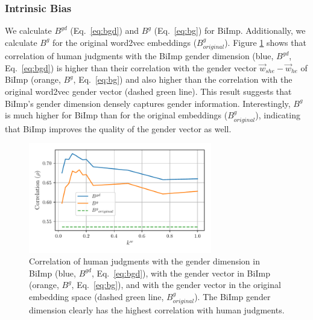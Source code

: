 \documentclass[11pt,a4paper]{article}
\def\proposedmethod{BiImp}
\begin{document}
\subsubsection{Intrinsic Bias}\label{sec:intrinsic_bias}
We calculate $B^{gd}$ (Eq.\  \ref{eq:bgd}) and $B^{g}$
(Eq.\  \ref{eq:bg}) for \proposedmethod{}. Additionally, we calculate $B^{g}$ for the original
word2vec embeddings ($B^{g}_{original}$).  Figure
\ref{fig:corr} shows that correlation of human judgments
with the \proposedmethod{} gender dimension (blue, $B^{gd}$,
Eq.\  \ref{eq:bgd}) is higher than their correlation with
the gender
vector $\vec{w}_{she} - \vec{w}_{he}$ of \proposedmethod{}
(orange, $B^{g}$, Eq.\  \ref{eq:bg}) and also
higher than the correlation with the 
original
word2vec gender vector (dashed green line). This result suggests
that \proposedmethod{}'s gender dimension  densely captures  gender
information. Interestingly, $B^{g}$ is
much higher for \proposedmethod{} than for the
original embeddings ($B^{g}_{original}$), indicating that
\proposedmethod{} improves the quality of the gender vector
as well.



\begin{figure}[h]
 	\centering
	\includegraphics[width=8.0cm]{Figures/gender_correlation.pdf}
	\caption{Correlation of human judgments with the
          gender dimension in \proposedmethod{} (blue,
          $B^{gd}$, Eq.\  \ref{eq:bgd}), with the gender
          vector in \proposedmethod{} (orange, $B^{g}$,
          Eq.\  \ref{eq:bg}), and with the gender vector in
          the original embedding space (dashed green line,
          $B^{g}_{original}$). The \proposedmethod{} gender
          dimension clearly has the highest correlation with
        human judgments.}
	\label{fig:corr}
\end{figure}
\end{document}
